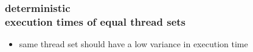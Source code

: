 \documentclass[utf8,10pt]{beamer}
\begin{document}
\begin{frame}
  \frametitle{deterministic \\execution times of equal thread sets}
  \begin{itemize}
    \item same thread set should have a low variance in execution time
  \end{itemize}
\end{frame}



\end{document}

